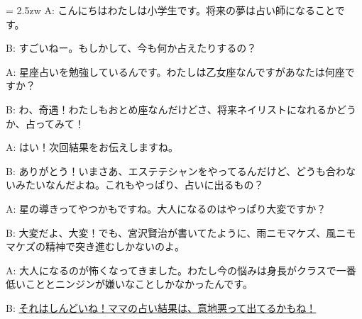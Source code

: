 \documentclass[11pt]{amsart}
\title{}
\author{}
\newenvironment{hangall}[1]{\hangindent = 2.5zw\everypar{\hangindent = 2.5zw}}{}
\begin{document}
\maketitle
\begin{hangall}{}%
A: こんにちはわたしは小学生です。将来の夢は占い師になることです。

B: すごいねー。もしかして、今も何か占えたりするの？

A: 星座占いを勉強しているんです。わたしは乙女座なんですがあなたは何座ですか？

B: わ、奇遇！わたしもおとめ座なんだけどさ、将来ネイリストになれるかどうか、占ってみて！

A: はい！次回結果をお伝えしますね。

B: ありがとう！いまさあ、エステテシャンをやってるんだけど、どうも合わないみたいなんだよね。これもやっぱり、占いに出るもの？

A: 星の導きってやつかもですね。大人になるのはやっぱり大変ですか？

B: 大変だよ、大変！でも、宮沢賢治が書いてたように、雨ニモマケズ、風ニモマケズの精神で突き進むしかないのよ。

A: 大人になるのが怖くなってきました。わたし今の悩みは身長がクラスで一番低いこととニンジンが嫌いなことしかなかったんです。

B: \ul{それはしんどいね！ママの占い結果は、意地悪って出てるかもね！}\end{hangall}
\end{document}
